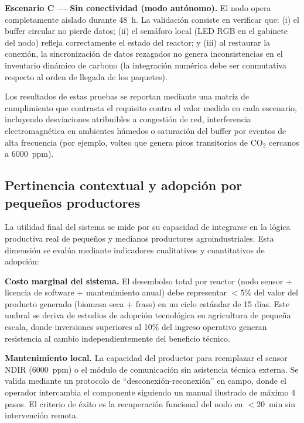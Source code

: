 \textbf{Escenario C --- Sin conectividad (modo autónomo).} El nodo opera completamente aislado durante 48~h. La validación consiste en verificar que: (i) el buffer circular no pierde datos; (ii) el semáforo local (LED RGB en el gabinete del nodo) refleja correctamente el estado del reactor; y (iii) al restaurar la conexión, la sincronización de datos rezagados no genera inconsistencias en el inventario dinámico de carbono (la integración numérica debe ser conmutativa respecto al orden de llegada de los paquetes).

Los resultados de estas pruebas se reportan mediante una matriz de cumplimiento que contrasta el requisito contra el valor medido en cada escenario, incluyendo desviaciones atribuibles a congestión de red, interferencia electromagnética en ambientes húmedos o saturación del buffer por eventos de alta frecuencia (por ejemplo, volteo que genera picos transitorios de CO$_2$ cercanos a 6000~ppm).

\subsection{Pertinencia contextual y adopción por pequeños productores}
\label{subsec:cap5_pertinencia}

La utilidad final del sistema se mide por su capacidad de integrarse en la lógica productiva real de pequeños y medianos productores agroindustriales. Esta dimensión se evalúa mediante indicadores cualitativos y cuantitativos de adopción:

\textbf{Costo marginal del sistema.} El desembolso total por reactor (nodo sensor + licencia de software + mantenimiento anual) debe representar $< 5$\% del valor del producto generado (biomasa seca + frass) en un ciclo estándar de 15 días. Este umbral se deriva de estudios de adopción tecnológica en agricultura de pequeña escala, donde inversiones superiores al 10\% del ingreso operativo generan resistencia al cambio independientemente del beneficio técnico.

\textbf{Mantenimiento local.} La capacidad del productor para reemplazar el sensor NDIR (6000~ppm) o el módulo de comunicación sin asistencia técnica externa. Se valida mediante un protocolo de ``desconexión-reconexión'' en campo, donde el operador intercambia el componente siguiendo un manual ilustrado de máximo 4 pasos. El criterio de éxito es la recuperación funcional del nodo en $< 20$~min sin intervención remota.

